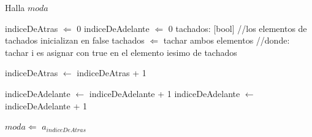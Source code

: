 \begin{algorithm}
\caption{Halla $moda$}
\begin{algorithmic}[1]
\STATE indiceDeAtras $\Leftarrow$ 0
\STATE indiceDeAdelante $\Leftarrow$ 0
\STATE tachados: [bool] //los elementos de tachados inicializan en false
        \STATE tachados $\Leftarrow$ tachar ambos elementos //donde: tachar i es asignar con true en el elemento iesimo de tachados

            \STATE indiceDeAtras $\leftarrow$ indiceDeAtras + 1
        \ENDWHILE
    
            \STATE indiceDeAdelante $\leftarrow$ indiceDeAdelante + 1
        \ENDWHILE
    \ELSE
        \STATE indiceDeAdelante $\leftarrow$ indiceDeAdelante + 1
    \ENDIF

\ENDWHILE
\STATE $moda \Leftarrow$ $a_{indiceDeAtras}$
\end{algorithmic}
\end{algorithm}
